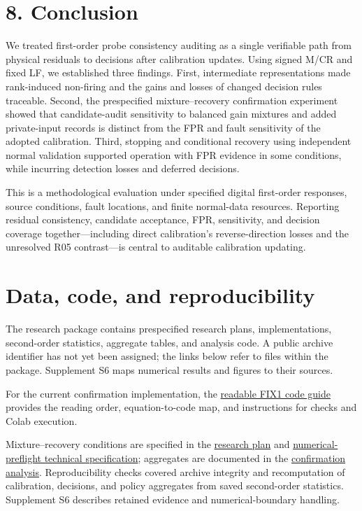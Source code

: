 \documentclass[10pt,a4paper]{article}
\begin{document}
\section{8. Conclusion}

We treated first-order probe consistency auditing as a single verifiable path from physical residuals to decisions after calibration updates. Using signed M/CR and fixed LF, we established three findings. First, intermediate representations made rank-induced non-firing and the gains and losses of changed decision rules traceable. Second, the prespecified mixture–recovery confirmation experiment showed that candidate-audit sensitivity to balanced gain mixtures and added private-input records is distinct from the FPR and fault sensitivity of the adopted calibration. Third, stopping and conditional recovery using independent normal validation supported operation with FPR evidence in some conditions, while incurring detection losses and deferred decisions.

This is a methodological evaluation under specified digital first-order responses, source conditions, fault locations, and finite normal-data resources. Reporting residual consistency, candidate acceptance, FPR, sensitivity, and decision coverage together—including direct calibration's reverse-direction losses and the unresolved R05 contrast—is central to auditable calibration updating.

\section{Data, code, and reproducibility}

The research package contains prespecified research plans, implementations, second-order statistics, aggregate tables, and analysis code. A public archive identifier has not yet been assigned; the links below refer to files within the package. Supplement S6 maps numerical results and figures to their sources.

For the current confirmation implementation, the \href{https://github.com/metaSATOKEN/First-Order-Probes/blob/789f3c83bc85511d9e7a65f083c5806f2d36e8f2/numerics/experiments/pr0012_fix1/README.md}{readable FIX1 code guide} provides the reading order, equation-to-code map, and instructions for checks and Colab execution.

Mixture–recovery conditions are specified in the \href{https://github.com/metaSATOKEN/First-Order-Probes/blob/789f3c83bc85511d9e7a65f083c5806f2d36e8f2/audits/prereg/PR-0012_mixture_recovery_confirmation.md}{research plan} and \href{https://github.com/metaSATOKEN/First-Order-Probes/blob/789f3c83bc85511d9e7a65f083c5806f2d36e8f2/audits/prereg/PR-0012_A01_preflight_boundary_fix.md}{numerical-preflight technical specification}; aggregates are documented in the \href{https://github.com/metaSATOKEN/First-Order-Probes/blob/789f3c83bc85511d9e7a65f083c5806f2d36e8f2/numerics/analysis/pr0012_64bf0f2c7697_confirmation_v1/PR0012_CONFIRMATION_REPORT_JA.md}{confirmation analysis}. Reproducibility checks covered archive integrity and recomputation of calibration, decisions, and policy aggregates from saved second-order statistics. Supplement S6 describes retained evidence and numerical-boundary handling.
\end{document}
